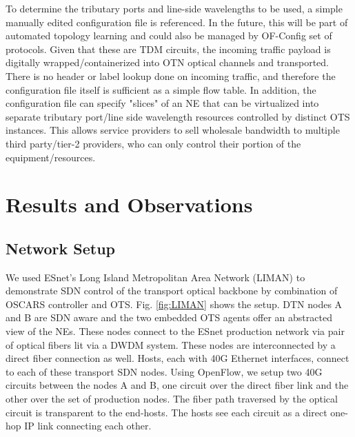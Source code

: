 \documentclass{sig-alternate-2013}
\begin{document}
 To determine the tributary ports and line-side wavelengths to be used, a simple manually edited configuration file is referenced. In the future, this will be part of automated topology learning and could also be managed by OF-Config set of protocols.  Given that
 these are TDM circuits, the incoming traffic payload is digitally wrapped/containerized into OTN optical channels and transported.  
 There is no header or label lookup done on incoming traffic, and therefore the configuration  file itself is sufficient as a simple flow table. 
 In addition, the configuration file can specify "slices" of an NE that can be virtualized into separate tributary port/line side wavelength 
 resources controlled by distinct OTS instances.  This allows service providers to sell wholesale bandwidth to multiple third party/tier-2 providers,
 who can only control their portion of the equipment/resources.

\section{Results and Observations}
\label{sec:results}
 \subsection{Network Setup}
 \label{sec:testbed}
 We used ESnet's Long Island Metropolitan Area Network (LIMAN) to demonstrate SDN control of the
 transport optical backbone by combination of OSCARS controller and OTS. Fig. \ref{fig:LIMAN} shows the setup. DTN nodes 
 A and B are SDN aware and the two embedded OTS agents offer an abstracted view of the NEs. These nodes connect
 to the ESnet production network via pair of optical fibers lit via a DWDM system. These nodes are interconnected by a direct
 fiber connection as well. Hosts, each with 40G Ethernet interfaces, connect to each of these transport SDN nodes. Using OpenFlow,
 we setup two 40G circuits between the nodes A and B, one circuit over the direct fiber link and the other over the set of production nodes.
 The fiber path traversed by the optical circuit is transparent to the end-hosts. The hosts see each circuit as a direct one-hop IP link connecting each other.
\end{document}
